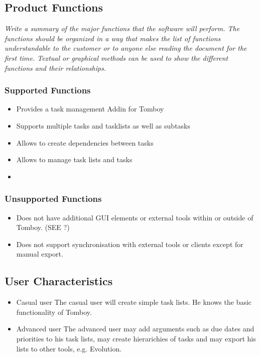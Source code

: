 \subsection{Product Functions}
\label{description:functions}
\textit{
Write a summary of the major functions that the software will perform. The functions should be organized in a way that makes the list of functions understandable to the customer or to anyone else reading the document for the first time. Textual or graphical methods can be used to show the different functions and their relationships.
}
	\subsubsection*{Supported Functions}
	\label{description:functions:supported}
	\begin{itemize}
		\item Provides a task management Addin for Tomboy
                \item Supports multiple tasks and tasklists as well as subtasks
                \item Allows to create dependencies between tasks
                \item Allows to manage task lists and tasks
                \item 
	\end{itemize}

	\subsubsection*{Unsupported Functions}
	\label{description:functions:unsupported}
	\begin{itemize}
		\item Does not have additional GUI elements or external tools within or outside of Tomboy. (SEE ?)
		\item Does not support synchronisation with external tools or clients except for manual export.
	\end{itemize}
	

\subsection{User Characteristics}
\label{description:usercharacteristics}
\begin{itemize}
\item Casual user
The casual user will create simple task lists. He knows the basic functionality of Tomboy.

\item Advanced user
The advanced user may add arguments such as due dates and priorities to his task lists, may create hierarichies of tasks and may export his lists to other tools, e.g. Evolution.
\end{itemize}


